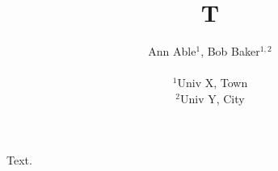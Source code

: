 \documentclass{article}
\begin{document}
\title{T}
\author{Ann Able$^{1}$, Bob Baker$^{1,2}$ \\ \parbox{8cm}{$^1$Univ X, Town \\ $^2$Univ Y, City}}
\maketitle
Text.
\end{document}
